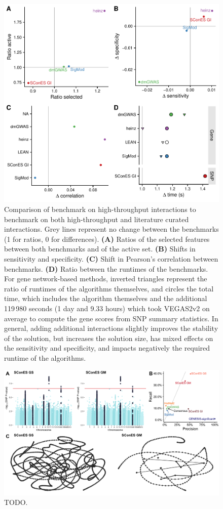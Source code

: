 \documentclass[twocolumn, 10pt]{article}
\begin{document}
\begin{figure}[htbp]
\centering
\includegraphics[width=.9\linewidth]{./figures/sfigure_7.pdf}
\caption{\label{sfig:lc_ht_comparison}
Comparison of benchmark on high-throughput interactions to benchmark on both high-throughput and literature curated interactions. Grey lines represent no change between the benchmarks (1 for ratios, 0 for differences). \textbf{(A)} Ratios of the selected features between both benchmarks and of the active set. \textbf{(B)} Shifts in sensitivity and specificity. \textbf{(C)} Shift in Pearson's correlation between benchmarks. \textbf{(D)} Ratio between the runtimes of the benchmarks. For gene network-based methods, inverted triangles represent the ratio of runtimes of the algorithms themselves, and circles the total time, which includes the algorithm themselves and the additional 119\,980 seconds (1 day and 9.33 hours) which took VEGAS2v2 on average to compute the gene scores from SNP summary statistics. In general, adding additional interactions slightly improves the stability of the solution, but increases the solution size, has mixed effects on the sensitivity and specificity, and impacts negatively the required runtime of the algorithms.}
\end{figure}

\begin{figure}[htbp]
  \centering
  \includegraphics[width=.9\linewidth]{./figures/sfigure_8.png}
  \caption{\label{sfig:scones_gsm} TODO.}
\end{figure}
\end{document}
